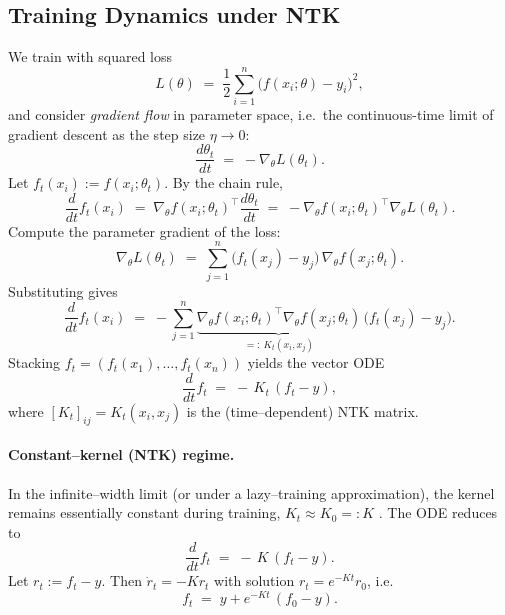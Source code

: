 %

\subsection{Training Dynamics under NTK}

We train with squared loss
\[
	L(\theta)\;=\;\frac{1}{2}\sum_{i=1}^n \big(f(x_i;\theta)-y_i\big)^2,
\]
and consider \emph{gradient flow} in parameter space, i.e.\ the continuous-time limit
of gradient descent as the step size $\eta \to 0$:
\[
	\frac{d\theta_t}{dt}\;=\;-\nabla_\theta L(\theta_t).
\]
Let $f_t(x_i):=f(x_i;\theta_t)$. By the chain rule,
\[
	\frac{d}{dt} f_t(x_i)
	\;=\;\nabla_\theta f(x_i;\theta_t)^\top \frac{d\theta_t}{dt}
	\;=\;-\nabla_\theta f(x_i;\theta_t)^\top \nabla_\theta L(\theta_t).
\]
Compute the parameter gradient of the loss:
\[
	\nabla_\theta L(\theta_t)\;=\;\sum_{j=1}^n \big(f_t(x_j)-y_j\big)\,\nabla_\theta f(x_j;\theta_t).
\]
Substituting gives
\[
	\frac{d}{dt} f_t(x_i)
	\;=\;-\sum_{j=1}^n \underbrace{\nabla_\theta f(x_i;\theta_t)^\top \nabla_\theta f(x_j;\theta_t)}_{=:~K_t(x_i,x_j)}\,
	\big(f_t(x_j)-y_j\big).
\]
Stacking $f_t=(f_t(x_1),\dots,f_t(x_n))$ yields the vector ODE
\[
	\frac{d}{dt} f_t \;=\; -\,K_t\,(f_t - y),
\]
where $[K_t]_{ij}=K_t(x_i,x_j)$ is the (time–dependent) NTK matrix.

\paragraph{Constant–kernel (NTK) regime.}
In the infinite–width limit (or under a lazy–training approximation), the
kernel remains essentially constant during training, $K_t \approx K_0=:K$ \citep{jacot2018ntk}. The
ODE reduces to
\[
	\frac{d}{dt} f_t \;=\; -\,K\,(f_t - y).
\]
Let $r_t:=f_t-y$. Then $\dot r_t=-Kr_t$ with solution $r_t=e^{-Kt}r_0$, i.e.
\[
	f_t \;=\; y + e^{-Kt}\,(f_0-y).
\]

